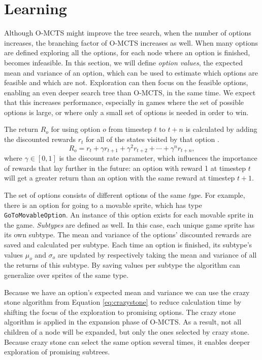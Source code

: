 \section{Learning}
\label{sec:learning}
Although O-MCTS might improve the tree search, when the number of options
increases, the branching factor of O-MCTS increases as well. When many options
are defined exploring all the options, for each node where an option is
finished, becomes infeasible. In this section, we will define \emph{option
values}, the expected mean and variance of an option, which can be used to
estimate which options are feasible and which are not. Exploration can then
focus on the feasible options, enabling an even deeper search tree than O-MCTS,
in the same time. We expect that this increases performance, especially in games
where the set of possible options is large, or where only a small set of options
is needed in order to win.

The return $R_o$ for using option $o$ from timestep $t$ to $t+n$ is calculated
by adding the discounted rewards $r_t$ for all of the states visited by that
option \cite{sutton1999between}. $$R_o = r_{t} + \gamma r_{t+1} + \gamma^2 r_{t+2} + \cdots + \gamma^n
r_{t+n},$$ where $\gamma \in [0, 1]$ is the discount rate parameter, which
influences the importance of rewards that lay further in the future: an option
with reward 1 at timestep $t$ will get a greater return than an option with the
same reward at timestep $t+1$.  

The set of options consists of different options of the same \emph{type}. For example,
there is an option for going to a movable sprite, which has type
\texttt{GoToMovableOption}. An instance of this option exists for each movable
sprite in the game. \emph{Subtypes} are defined as well. In this case, each
unique game sprite has its own subtype. The mean and variance of the options'
discounted rewards are saved and calculated per subtype. Each time an option is
finished, its subtype's values $\mu_o$ and $\sigma_o$ are updated by
respectively taking the mean and variance of all the returns of this subtype. By
saving values per subtype the algorithm can generalize over sprites of the same
type.

Because we have an option's expected mean and variance we can use the crazy
stone algorithm from Equation \ref{eq:crazystone} to reduce calculation time by
shifting the focus of the exploration to promising options. The crazy stone
algorithm is applied in the expansion phase of O-MCTS. As a result, not all
children of a node will be expanded, but only the ones selected by crazy stone.
Because crazy stone can select the same option several times, it enables deeper
exploration of promising subtrees. 


